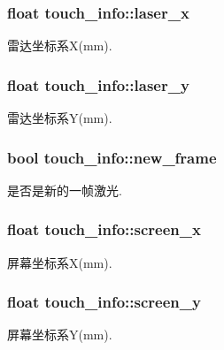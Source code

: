 \subsubsection[{\texorpdfstring{laser\+\_\+x}{laser_x}}]{\setlength{\rightskip}{0pt plus 5cm}float touch\+\_\+info\+::laser\+\_\+x}\hypertarget{structtouch__info_a8978922f7e70732e5a096948ecc14f1c}{}\label{structtouch__info_a8978922f7e70732e5a096948ecc14f1c}
雷达坐标系\+X(mm). 
\subsubsection[{\texorpdfstring{laser\+\_\+y}{laser_y}}]{\setlength{\rightskip}{0pt plus 5cm}float touch\+\_\+info\+::laser\+\_\+y}\hypertarget{structtouch__info_a0681e323236f958c18ea8d41f8610496}{}\label{structtouch__info_a0681e323236f958c18ea8d41f8610496}
雷达坐标系\+Y(mm). 
\subsubsection[{\texorpdfstring{new\+\_\+frame}{new_frame}}]{\setlength{\rightskip}{0pt plus 5cm}bool touch\+\_\+info\+::new\+\_\+frame}\hypertarget{structtouch__info_a3fe96c6e49b718988829f9224bb482ff}{}\label{structtouch__info_a3fe96c6e49b718988829f9224bb482ff}
是否是新的一帧激光. 
\subsubsection[{\texorpdfstring{screen\+\_\+x}{screen_x}}]{\setlength{\rightskip}{0pt plus 5cm}float touch\+\_\+info\+::screen\+\_\+x}\hypertarget{structtouch__info_a0e392d11daede4a08a414c882b4bd7ff}{}\label{structtouch__info_a0e392d11daede4a08a414c882b4bd7ff}
屏幕坐标系\+X(mm). 
\subsubsection[{\texorpdfstring{screen\+\_\+y}{screen_y}}]{\setlength{\rightskip}{0pt plus 5cm}float touch\+\_\+info\+::screen\+\_\+y}\hypertarget{structtouch__info_a1f9496ba80ef2bf04292148b327e3a6a}{}\label{structtouch__info_a1f9496ba80ef2bf04292148b327e3a6a}
屏幕坐标系\+Y(mm). 
